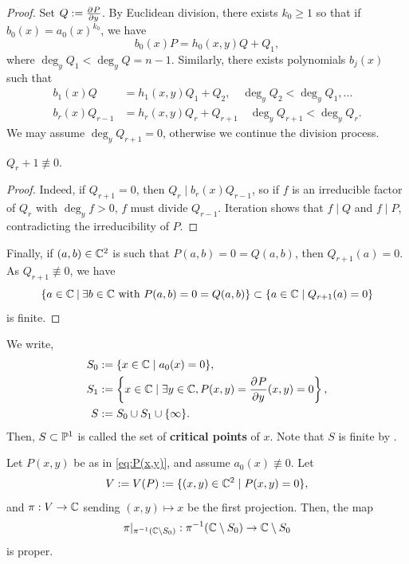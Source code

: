 \documentclass[11pt]{article}
\begin{document}
\begin{proof}
    Set $Q:=\partder{P}{y}$. By Euclidean division, there exists $k_0 \geq 1$ so that if $b_0(x)=a_0(x)^{k_0}$, we have
    $$b_0(x)P=h_0(x,y)Q+Q_1,$$
    where $\deg_yQ_1 < \deg _yQ = n-1$. Similarly, there exists polynomials $b_j(x)$ such that
    \begin{align*}
        b_1(x)Q &= h_1(x,y)Q_1 + Q_2, \quad \deg_yQ_2 < \deg_yQ_1,\dots
        \\ b_r(x)Q_{r-1} &=h_r(x,y) Q_r + Q_{r+1} \quad \deg_y Q_{r+1}< \deg _yQ_r.
    \end{align*}
    We may assume $\deg_y Q_{r+1}=0$, otherwise we continue the division process.
    \begin{claim}
        $Q_r+1 \not \equiv 0$.
    \end{claim}
    \begin{proof}
        Indeed, if $Q_{r+1}=0$, then $Q_r \mid b_r(x)Q_{r-1}$, so if $f$ is an irreducible factor of $Q_r$ with $\deg_yf>0$, $f$ must divide $Q_{r-1}$. Iteration shows that $f\mid Q$ and $f \mid P$, contradicting the irreducibility of $P$.
    \end{proof}
    Finally, if $(a,b) \in \C^2$ is such that $P(a,b)=0=Q(a,b)$, then $Q_{r+1}(a)=0$. As $Q_{r+1} \not \equiv 0$, we have
    $$\brax{a \in \C \setbar \exists b \in \C \text{ with } P(a,b)=0=Q(a,b)}\subset \{a\in \C \mid Q_{r+1}(a)=0\}$$
    is finite.
\end{proof}

\begin{defn}
    We write,
    \begin{align*}
        S_0 &:=\{ x \in \C \mid a_0(x)=0\},
        \\ S_1 &:= \brax{x \in \C \mid \exists y \in \C, P(x,y)=\partder{P}{y}(x,y)=0},
        \\ S &:= S_0\cup S_1 \cup \{\infty\}.
    \end{align*}
    Then, $S \subset \P^1$ is called the set of \textbf{critical points} of $x$. Note that $S$ is finite by .
\end{defn}

\begin{prop}[][label=prop:projproper]
    Let $P(x,y)$ be as in \eqref{eq:P(x,y)}, and assume $a_0(x) \not \equiv 0$. Let
    $$V := V(P):= \{(x,y) \in \C^2 \mid P(x,y)=0\},$$
    and $\pi:V \to \C$ sending $(x,y) \mapsto x$ be the first projection. Then, the map
    $$\pi|_{\pi^{-1}(\C\setminus S_0)}:\pi^{-1}(\C\setminus S_0) \to \C\setminus S_0$$
    is proper.
\end{prop}
\end{document}

